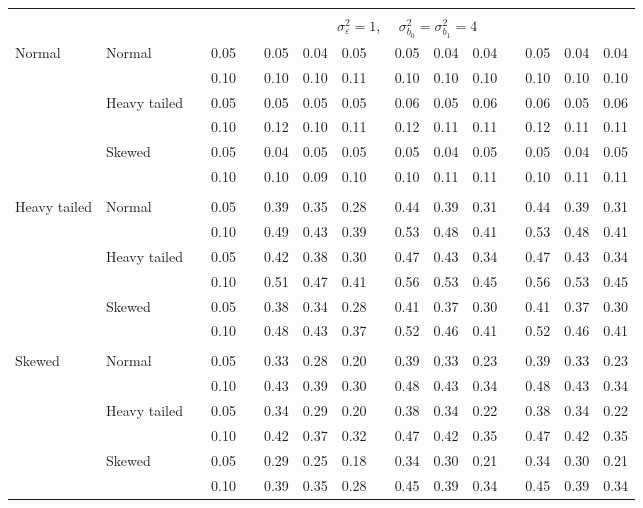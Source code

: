 \documentclass{article} %
\begin{document}
\begin{table}[ht]
\begin{scriptsize}
\begin{center}
\begin{tabular}{ll p{.1cm} c p{.1cm} rrr p{.1cm} rrr p{.1cm} rrr}
&&&&&&&&&&&&&&&\\
& && && \multicolumn{9}{c}{$\sigma_{\varepsilon}^2 = 1$, \ \ $\sigma_{b_0}^2 = \sigma_{b_1}^2 = 4$} \\ \cline{6-16}
\rowcolor{gray!20}Normal       & Normal       && 0.05 &&   0.05 & 0.04 & 0.05 && 0.05 & 0.04 & 0.04 && 0.05 & 0.04 & 0.04 \\ 
\rowcolor{gray!20}             &              && 0.10 &&   0.10 & 0.10 & 0.11 && 0.10 & 0.10 & 0.10 && 0.10 & 0.10 & 0.10 \\ 
\rowcolor{gray!20}             & Heavy tailed && 0.05 &&   0.05 & 0.05 & 0.05 && 0.06 & 0.05 & 0.06 && 0.06 & 0.05 & 0.06 \\ 
\rowcolor{gray!20}             &              && 0.10 &&   0.12 & 0.10 & 0.11 && 0.12 & 0.11 & 0.11 && 0.12 & 0.11 & 0.11 \\ 
\rowcolor{gray!20}             & Skewed       && 0.05 &&   0.04 & 0.05 & 0.05 && 0.05 & 0.04 & 0.05 && 0.05 & 0.04 & 0.05 \\ 
\rowcolor{gray!20}             &              && 0.10 &&   0.10 & 0.09 & 0.10 && 0.10 & 0.11 & 0.11 && 0.10 & 0.11 & 0.11 \\ 
             &&&&&&&&&&&&&&&\\
Heavy tailed & Normal       && 0.05 &&   0.39 & 0.35 & 0.28 && 0.44 & 0.39 & 0.31 && 0.44 & 0.39 & 0.31 \\ 
             &              && 0.10 &&   0.49 & 0.43 & 0.39 && 0.53 & 0.48 & 0.41 && 0.53 & 0.48 & 0.41 \\ 
             & Heavy tailed && 0.05 &&   0.42 & 0.38 & 0.30 && 0.47 & 0.43 & 0.34 && 0.47 & 0.43 & 0.34 \\ 
             &              && 0.10 &&   0.51 & 0.47 & 0.41 && 0.56 & 0.53 & 0.45 && 0.56 & 0.53 & 0.45 \\ 
             & Skewed       && 0.05 &&   0.38 & 0.34 & 0.28 && 0.41 & 0.37 & 0.30 && 0.41 & 0.37 & 0.30 \\ 
             &              && 0.10 &&   0.48 & 0.43 & 0.37 && 0.52 & 0.46 & 0.41 && 0.52 & 0.46 & 0.41 \\ 
             &&&&&&&&&&&&&&&\\
Skewed       & Normal       && 0.05 &&   0.33 & 0.28 & 0.20 && 0.39 & 0.33 & 0.23 && 0.39 & 0.33 & 0.23 \\ 
             &              && 0.10 &&   0.43 & 0.39 & 0.30 && 0.48 & 0.43 & 0.34 && 0.48 & 0.43 & 0.34 \\ 
             & Heavy tailed && 0.05 &&   0.34 & 0.29 & 0.20 && 0.38 & 0.34 & 0.22 && 0.38 & 0.34 & 0.22 \\ 
             &              && 0.10 &&   0.42 & 0.37 & 0.32 && 0.47 & 0.42 & 0.35 && 0.47 & 0.42 & 0.35 \\ 
             & Skewed       && 0.05 &&   0.29 & 0.25 & 0.18 && 0.34 & 0.30 & 0.21 && 0.34 & 0.30 & 0.21 \\ 
             &              && 0.10 &&   0.39 & 0.35 & 0.28 && 0.45 & 0.39 & 0.34 && 0.45 & 0.39 & 0.34 \\ 



\end{tabular}
\end{center}
\end{scriptsize}
\end{table}
\end{document}
